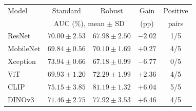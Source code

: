 \begin{tabular}{lcccc}
\toprule
Model & Standard & Robust & Gain & Positive \\
 & \multicolumn{2}{c}{AUC (\%), mean $\pm$ SD} & (pp) & pairs \\
\midrule
ResNet & $70.00 \pm 2.53$ & $67.98 \pm 2.50$ & $-2.02$ & 1/5 \\
MobileNet & $69.84 \pm 0.56$ & $70.10 \pm 1.69$ & $+0.27$ & 4/5 \\
Xception & $73.94 \pm 0.66$ & $67.18 \pm 0.99$ & $-6.77$ & 0/5 \\
ViT & $69.93 \pm 1.20$ & $72.29 \pm 1.99$ & $+2.36$ & 4/5 \\
CLIP & $75.15 \pm 3.85$ & $81.19 \pm 1.32$ & $+6.04$ & 5/5 \\
DINOv3 & $71.46 \pm 2.75$ & $77.92 \pm 3.53$ & $+6.46$ & 4/5 \\
\bottomrule
\end{tabular}
